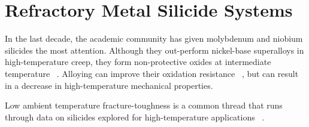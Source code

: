 \section{Refractory Metal Silicide Systems}

In the last decade, the academic community has given molybdenum and niobium silicides the most attention.  Although they out-perform nickel-base superalloys in high-temperature creep, they form non-protective oxides at intermediate temperature ~\cite{ miracle94b, mitra06, ochiai06, sauthoff88, yanagihara96}.  Alloying can improve their oxidation resistance ~\cite{ramberg93, tomasi97, raj95a}, but can result in a decrease in high-temperature mechanical properties.

Low ambient temperature fracture-toughness is a common thread that runs through data on silicides explored for high-temperature applications  ~\cite{kumar94, miracle94b, shah92, sadananda99}.

